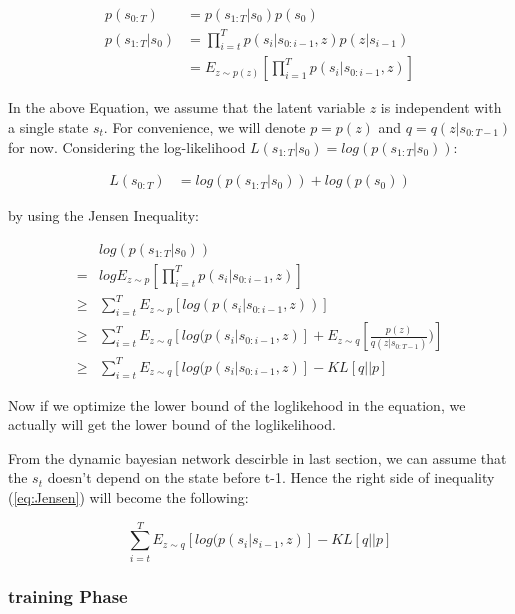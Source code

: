 \documentclass[conference]{IEEEtran}
\begin{document}
\begin{align}
p(s_{0:T}) &= p(s_{1:T} | s_{0})p(s_{0}) \\
p(s_{1:T} | s_{0}) &= \prod_{i = t}^{T}{p(s_{i} | s_{0:i-1}, z)}p(z | s_{i-1})\\
&= E_{z\sim p(z)}[ \prod_{i = 1}^{T}{p(s_{i} | s_{0:i-1}, z)} ]
\end{align}

In the above Equation, we assume that the latent variable $z$ is independent with a single state $s_{t}$. For convenience, we will denote $p = p(z)$ and $q = q(z | s_{0:T-1})$ for now. Considering the log-likelihood $L(s_{1:T}|s_{0}) = log(p(s_{1:T} | s_{0}))$:

\begin{align}
L(s_{0:T}) & = log(p(s_{1:T} | s_{0})) + log(p(s_{0}))
\end{align}

by using the Jensen Inequality:

\begin{equation}\label{eq:Jensen}
\begin{array}{rl}
&log(p(s_{1:T} | s_{0}))\\
= &logE_{z\sim p}[\prod_{i = t}^{T}{p(s_{i} | s_{0:i-1}, z)}]\\
\geq &\sum_{i = t}^{T}{ E_{z\sim p}[ log(p(s_{i} | s_{0:i-1}, z))] }\\
\geq &\sum_{i = t}^{T}{ E_{z\sim q}[ log(p(s_{i} | s_{0:i-1}, z)] + E_{z\sim q}[\frac{p(z)}{q(z | s_{0:T-1})})]} \\
\geq &\sum_{i = t}^{T}{ E_{z\sim q}[ log(p(s_{i} | s_{0:i-1}, z)]} - KL[q || p]
\end{array}
\end{equation}

Now if we optimize the lower bound of the loglikehood in the equation, we actually will get the lower bound of the loglikelihood.

From the dynamic bayesian network descirble in last section, we can assume that the $s_{t}$ doesn't depend on the state before t-1. Hence the right side of inequality (\ref{eq:Jensen}) will become the following:

\begin{equation}
\sum_{i = t}^{T}{ E_{z\sim q}[ log(p(s_{i} | s_{i-1}, z)]} - KL[q || p]
\end{equation}

\subsubsection{training Phase}
\end{document}
